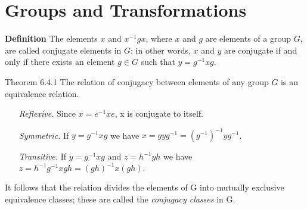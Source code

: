 \section{Groups and Transformations}

{\bf Definition} The elements $x$ and $x^{-1}gx$, where $x$ and $g$ are
elements of a group $G$, are called conjugate elements in $G$: in other 
words, $x$ and $y$ are conjugate if and only if there exists an element 
$g\in G$ such that $y = g^{-1}xg$.

Theorem 6.4.1 The relation of conjugacy between elements of any group
$G$ is an equivalence relation. 
\begin{itemize}
\item[\it Reflexive.] Since $x = e^{-1}xe$, x is conjugate to itself.
\item[\it Symmetric.] If $y=g^{-1}xg$ we have $x=gyg^{-1} =
(g^{-1})^{-1}y g^{-1}$.
\item[\it Transitive.] If $y=g^{-1}xg$ and $z=h^{-1}yh$ we have
$z=h^{-1}g^{-1}xgh=(gh)^{-1}x(gh).$
\end{itemize}

It follows that the relation divides the elements of G into mutually
exclusive equivalence classes; these are called the {\it conjugacy classes}
in G. 